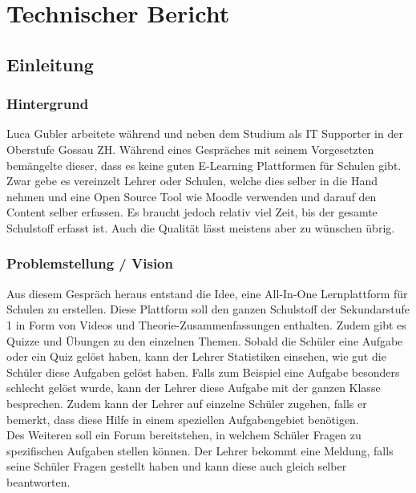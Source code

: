 \section{Technischer Bericht}
\subsection{Einleitung}

\subsubsection{Hintergrund}
Luca Gubler arbeitete während und neben dem Studium als IT Supporter in der Oberstufe Gossau ZH. Während eines Gespräches mit seinem Vorgesetzten bemängelte dieser, dass es keine guten E-Learning Plattformen für Schulen gibt. Zwar gebe es vereinzelt Lehrer oder Schulen, welche dies selber in die Hand nehmen und eine Open Source Tool wie Moodle verwenden und darauf den Content selber erfassen. Es braucht jedoch relativ viel Zeit, bis der gesamte Schulstoff erfasst ist. Auch die Qualität lässt meistens aber zu wünschen übrig.

\subsubsection{Problemstellung / Vision}
Aus diesem Gespräch heraus entstand die Idee, eine All-In-One Lernplattform für Schulen zu erstellen. Diese Plattform soll den ganzen Schulstoff der Sekundarstufe 1 in Form von Videos und Theorie-Zusammenfassungen enthalten. Zudem gibt es Quizze und Übungen zu den einzelnen Themen. Sobald die Schüler eine Aufgabe oder ein Quiz gelöst haben, kann der Lehrer Statistiken einsehen, wie gut die Schüler diese Aufgaben gelöst haben. Falls zum Beispiel eine Aufgabe besonders schlecht gelöst wurde, kann der Lehrer diese Aufgabe mit der ganzen Klasse besprechen. Zudem kann der Lehrer auf einzelne Schüler zugehen, falls er bemerkt, dass diese Hilfe in einem speziellen Aufgabengebiet benötigen.
\\
Des Weiteren soll ein Forum bereitstehen, in welchem Schüler Fragen zu spezifischen Aufgaben stellen können. Der Lehrer bekommt eine Meldung, falls seine Schüler Fragen gestellt haben und kann diese auch gleich selber beantworten.

